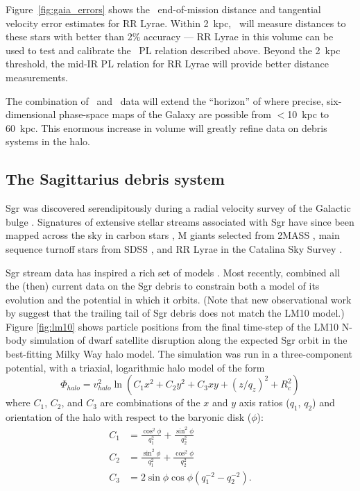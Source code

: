 Figure~\ref{fig:gaia_errors} shows the \gaia\ end-of-mission distance and
tangential velocity error estimates for RR Lyrae. Within 2~kpc, \gaia\ will
measure distances to these stars with better than 2\% accuracy --- RR Lyrae in
this volume can be used to test and calibrate the \spitzer\ PL relation
described above. Beyond the 2~kpc threshold, the mid-IR PL relation for RR Lyrae
will provide better distance measurements.

The combination of \spitzer\ and \gaia\ data will extend the ``horizon''
of where precise, six-dimensional phase-space maps of the Galaxy are possible
from $<$10~kpc to 60~kpc. This enormous increase in volume will greatly refine
data on debris systems in the halo.

\subsection{The Sagittarius debris system}
\label{sec:sgr}
Sgr was discovered serendipitously during a radial velocity survey of the
Galactic bulge \citep{ibata94}. Signatures of extensive stellar streams
associated with Sgr have since  been mapped across the sky in carbon stars
\citep{totten98}, M giants selected from 2MASS \citep{majewski03}, main sequence
turnoff stars from SDSS \citep{belokurov06}, and RR Lyrae in the Catalina Sky
Survey \citep{drake13}.

Sgr stream data has inspired a rich set of models \citep[e.g.,][]{johnston99b,
fellhauer06}. Most recently, \citet[][hereafter LM10]{law10} combined all the
(then) current data on the Sgr debris to constrain both a model of its evolution
and the potential in which it orbits. (Note that new observational work by
\citet{belokurov13} suggest that the trailing tail of Sgr debris does not
match the LM10 model.) Figure \ref{fig:lm10} shows particle positions from the
final time-step of the LM10 N-body simulation of dwarf satellite disruption
along the expected Sgr orbit in the best-fitting Milky Way halo model. The
simulation was run in a three-component potential, with a triaxial, logarithmic
halo model of the form
\begin{equation}
  \Phi_{halo} = v_{halo}^2 \ln(C_1 x^2 + C_2 y^2 + C_3 xy + (z/q_z)^2 + R_c^2)
\end{equation}
where $C_1$, $C_2$, and $C_3$ are combinations of the $x$ and $y$ axis ratios
($q_1$, $q_2$) and orientation of the halo with respect to the baryonic disk
($\phi$):
\begin{align}
  C_1 &= \frac{\cos^2\phi}{q_1^2} + \frac{\sin^2\phi}{q_2^2}\\
  C_2 &= \frac{\sin^2\phi}{q_1^2} + \frac{\cos^2\phi}{q_2^2}\\
  C_3 &= 2\sin\phi\cos\phi \left(q_1^{-2} - q_2^{-2}\right).
\end{align}

